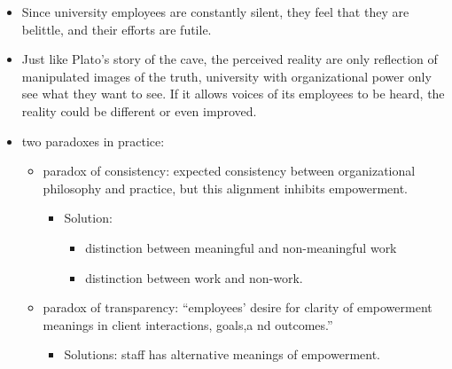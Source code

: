 \documentclass[
]{book}
\providecommand{\tightlist}{%
  \setlength{\itemsep}{0pt}\setlength{\parskip}{0pt}}
\begin{document}
\citep{Gan_2020}

\begin{itemize}
\tightlist
\item
  Since university employees are constantly silent, they feel that
  they are belittle, and their efforts are futile.
\item
  Just like Plato's story of the cave, the perceived reality are only
  reflection of manipulated images of the truth, university with
  organizational power only see what they want to see. If it allows
  voices of its employees to be heard, the reality could be different
  or even improved.
\end{itemize}

\citep{D_Enbeau_2013}

\begin{itemize}
\item
  two paradoxes in practice:

  \begin{itemize}
  \item
    paradox of consistency: expected consistency between
    organizational philosophy and practice, but this alignment
    inhibits empowerment.

    \begin{itemize}
    \item
      Solution:

      \begin{itemize}
      \item
        distinction between meaningful and non-meaningful work
      \item
        distinction between work and non-work.
      \end{itemize}
    \end{itemize}
  \item
    paradox of transparency: ``employees' desire for clarity of
    empowerment meanings in client interactions, goals,a nd
    outcomes.''

    \begin{itemize}
    \tightlist
    \item
      Solutions: staff has alternative meanings of empowerment.
    \end{itemize}
  \end{itemize}
\end{itemize}

\citep{Kantola_2014}
\end{document}
